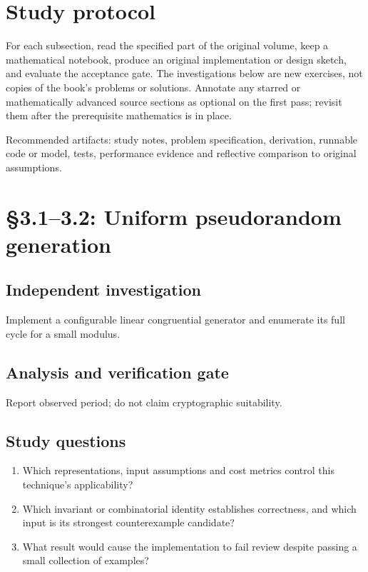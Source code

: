 \documentclass[11pt,letterpaper]{article}
\begin{document}
\tableofcontents
\clearpage
{}
\section{Study protocol}

For each subsection, read the specified part of the original volume, keep a mathematical notebook, produce an original implementation or design sketch, and evaluate the acceptance gate. The investigations below are new exercises, not copies of the book's problems or solutions. Annotate any starred or mathematically advanced source sections as optional on the first pass; revisit them after the prerequisite mathematics is in place.
\begin{evidencebox}Recommended artifacts: study notes, problem specification, derivation, runnable code or model, tests, performance evidence and reflective comparison to original assumptions.\end{evidencebox}

\section{\S 3.1--3.2: Uniform pseudorandom generation}
\subsection{Independent investigation}
Implement a configurable linear congruential generator and enumerate its full cycle for a small modulus.
\subsection{Analysis and verification gate}
Report observed period; do not claim cryptographic suitability.
\subsection{Study questions}
\begin{enumerate}
\item Which representations, input assumptions and cost metrics control this technique's applicability?
\item Which invariant or combinatorial identity establishes correctness, and which input is its strongest counterexample candidate?
\item What result would cause the implementation to fail review despite passing a small collection of examples?
\end{enumerate}
\end{document}
